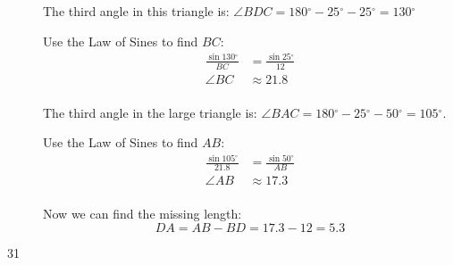 \documentclass{exam}
\newcommand{\dg}{\ensuremath{^\circ}}
\begin{document}
\begin{description}
        The third angle in this triangle is: $\angle BDC = 180 \dg - 25 \dg - 25 \dg = 130 \dg$

        Use the Law of Sines to find $BC$:
        \begin{align*}
          \frac{\sin 130 \dg}{BC} & = \frac{\sin 25 \dg}{12} \\
          \angle BC               & \approx 21.8 \\
        \end{align*}

        The third angle in the large triangle is: $\angle BAC = 180 \dg - 25 \dg - 50 \dg = 105 \dg$. 
        
        Use the Law of Sines to find $AB$:
        \begin{align*}
          \frac{\sin 105 \dg}{21.8} & = \frac{\sin 50 \dg}{AB} \\
          \angle AB                 & \approx 17.3 \\
        \end{align*}

        Now we can find the missing length:
        \[
          DA = AB - BD = 17.3 - 12 = \boxed{ 5.3 }
        \]

      \item[31] 


\end{description}
\end{document}
